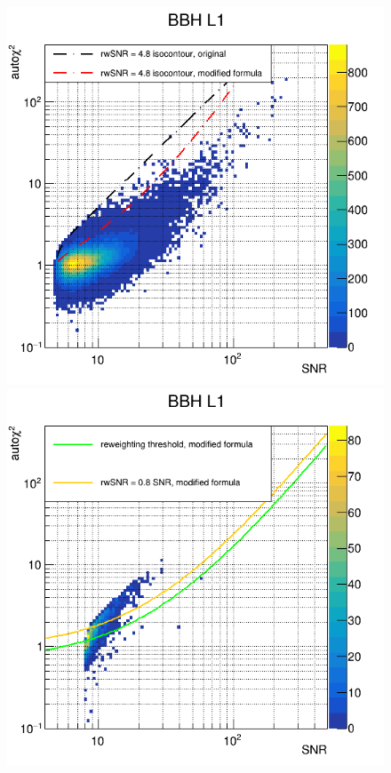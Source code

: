 \begin{figure}
  \hfill
  \begin{minipage}{0.45\linewidth}
    \centering
    \includegraphics[width=\linewidth]{sectionImprovement/rwSNR/cSnrAchi2_new2_L1_a12.png}
  \end{minipage}
  \hfill
  \begin{minipage}{0.45\linewidth}
    \centering
    \includegraphics[width=\linewidth]{sectionImprovement/rwSNR/cSnrAchi2_singles_new_L1_a12.png}

\end{minipage}
\end{figure}
